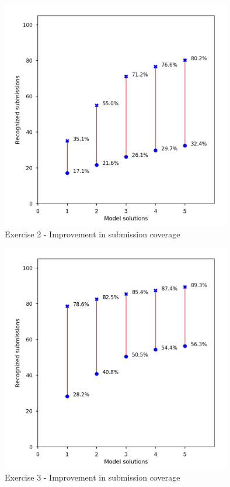 \begin{figure}
\centering
\includegraphics[height=10cm]{graphs/coverage-2.png}
\caption{Exercise 2 - Improvement in submission coverage}
\label{fig:improvements-coverage-2}
\end{figure}

\begin{figure}
\centering
\includegraphics[height=10cm]{graphs/coverage-3.png}
\caption{Exercise 3 - Improvement in submission coverage}
\label{fig:improvements-coverage-3}
\end{figure}

